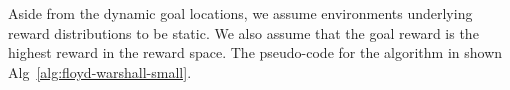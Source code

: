 Aside from the dynamic goal locations, we assume environments underlying reward
distributions to be static. We also assume that the goal reward is the
highest reward in the reward space.
The pseudo-code for the algorithm in shown Alg~\ref{alg:floyd-warshall-small}.




